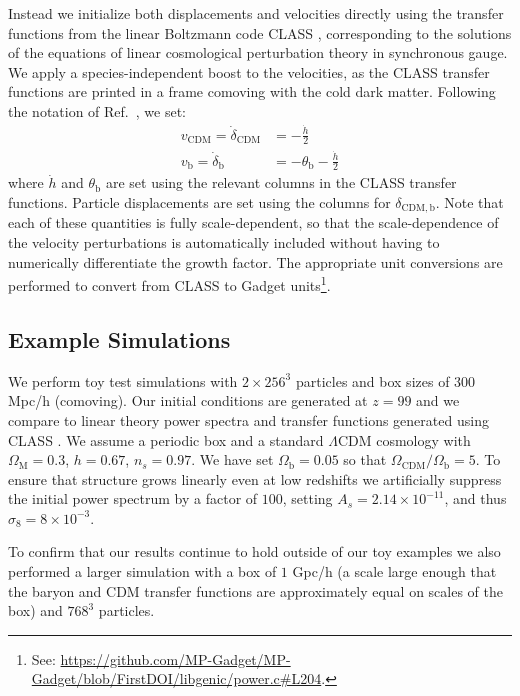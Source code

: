 \documentclass[a4paper,11pt]{article}
\begin{document}
Instead we initialize both displacements and velocities directly using the transfer functions from the linear Boltzmann code CLASS \cite{CLASS}, corresponding to the solutions of the equations of linear cosmological perturbation theory in synchronous gauge. We apply a species-independent boost to the velocities, as the CLASS transfer functions are printed in a frame comoving with the cold dark matter. Following the notation of Ref.~\cite{Ma:1995}, we set:
\begin{align}
 v_\mathrm{CDM} = \dot{\delta}_\mathrm{CDM}  &= - \frac{\dot{h}}{2} \\
 v_\mathrm{b} = \dot{\delta}_\mathrm{b}  &= - \theta_\mathrm{b} - \frac{\dot{h}}{2}
\end{align}
where $\dot{h}$ and $\theta_\mathrm{b}$ are set using the relevant columns in the CLASS transfer functions.
Particle displacements are set using the columns for $\delta_\mathrm{CDM, b}$. Note that each of these quantities is fully scale-dependent, so that the scale-dependence of the velocity perturbations is automatically included without having to numerically differentiate the growth factor. The appropriate unit conversions are performed to convert from CLASS to Gadget units\footnote{See: \protect\url{https://github.com/MP-Gadget/MP-Gadget/blob/FirstDOI/libgenic/power.c\#L204}.}.

\subsection{Example Simulations}

We perform toy test simulations with $2\times 256^3$ particles and box sizes of $300$ Mpc/h (comoving). Our initial conditions are generated at $z=99$ and we compare to linear theory power spectra and transfer functions generated using CLASS \cite{CLASS}. We assume a periodic box and a standard $\Lambda$CDM cosmology with $\Omega_\mathrm{M} = 0.3$, $h = 0.67$, $n_s = 0.97$. We have set $\Omega_\mathrm{b} = 0.05$ so that $\Omega_{\mathrm{CDM}}/ \Omega_\mathrm{b} = 5$.
To ensure that structure grows linearly even at low redshifts we artificially suppress the initial power spectrum by a factor of $100$, setting $A_s = 2.14\times 10^{-11}$, and thus $\sigma_8 = 8\times 10^{-3}$.

To confirm that our results continue to hold outside of our toy examples we also performed a larger simulation with a box of $1$ Gpc/h (a scale large enough that the baryon and CDM transfer functions are approximately equal on scales of the box) and $768^3$ particles.
\end{document}
